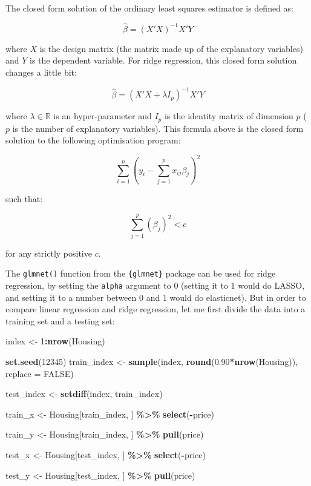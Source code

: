 \documentclass[
]{article}
\newenvironment{Shaded}{\begin{snugshade}}{\end{snugshade}}
\newcommand{\DataTypeTok}[1]{\textcolor[rgb]{0.13,0.29,0.53}{#1}}
\newcommand{\DecValTok}[1]{\textcolor[rgb]{0.00,0.00,0.81}{#1}}
\newcommand{\FloatTok}[1]{\textcolor[rgb]{0.00,0.00,0.81}{#1}}
\newcommand{\KeywordTok}[1]{\textcolor[rgb]{0.13,0.29,0.53}{\textbf{#1}}}
\newcommand{\NormalTok}[1]{#1}
\newcommand{\OperatorTok}[1]{\textcolor[rgb]{0.81,0.36,0.00}{\textbf{#1}}}
\newcommand{\OtherTok}[1]{\textcolor[rgb]{0.56,0.35,0.01}{#1}}
\newcommand{\StringTok}[1]{\textcolor[rgb]{0.31,0.60,0.02}{#1}}
\begin{document}
The closed form solution of the ordinary least squares estimator is defined as:

\[
\widehat{\beta} = (X'X)^{-1}X'Y
\]

where \(X\) is the design matrix (the matrix made up of the explanatory variables) and \(Y\) is the
dependent variable. For ridge regression, this closed form solution changes a little bit:

\[
\widehat{\beta} = (X'X + \lambda I_p)^{-1}X'Y
\]

where \(\lambda \in \mathbb{R}\) is an hyper-parameter and \(I_p\) is the identity matrix of dimension \(p\)
(\(p\) is the number of explanatory variables).
This formula above is the closed form solution to the following optimisation program:

\[
\sum_{i=1}^n \left(y_i - \sum_{j=1}^px_{ij}\beta_j\right)^2 
\]

such that:

\[
\sum_{j=1}^p(\beta_j)^2 < c
\]

for any strictly positive \(c\).

The \texttt{glmnet()} function from the \texttt{\{glmnet\}} package can be used for ridge regression, by setting
the \texttt{alpha} argument to 0 (setting it to 1 would do LASSO, and setting it to a number between
0 and 1 would do elasticnet). But in order to compare linear regression and ridge regression,
let me first divide the data into a training set and a testing set:

\begin{Shaded}
\begin{Highlighting}[]
\NormalTok{index \textless{}{-}}\StringTok{ }\DecValTok{1}\OperatorTok{:}\KeywordTok{nrow}\NormalTok{(Housing)}

\KeywordTok{set.seed}\NormalTok{(}\DecValTok{12345}\NormalTok{)}
\NormalTok{train\_index \textless{}{-}}\StringTok{ }\KeywordTok{sample}\NormalTok{(index, }\KeywordTok{round}\NormalTok{(}\FloatTok{0.90}\OperatorTok{*}\KeywordTok{nrow}\NormalTok{(Housing)), }\DataTypeTok{replace =} \OtherTok{FALSE}\NormalTok{)}

\NormalTok{test\_index \textless{}{-}}\StringTok{ }\KeywordTok{setdiff}\NormalTok{(index, train\_index)}

\NormalTok{train\_x \textless{}{-}}\StringTok{ }\NormalTok{Housing[train\_index, ] }\OperatorTok{\%\textgreater{}\%}\StringTok{ }
\StringTok{    }\KeywordTok{select}\NormalTok{(}\OperatorTok{{-}}\NormalTok{price)}

\NormalTok{train\_y \textless{}{-}}\StringTok{ }\NormalTok{Housing[train\_index, ] }\OperatorTok{\%\textgreater{}\%}\StringTok{ }
\StringTok{    }\KeywordTok{pull}\NormalTok{(price)}

\NormalTok{test\_x \textless{}{-}}\StringTok{ }\NormalTok{Housing[test\_index, ] }\OperatorTok{\%\textgreater{}\%}\StringTok{ }
\StringTok{    }\KeywordTok{select}\NormalTok{(}\OperatorTok{{-}}\NormalTok{price)}

\NormalTok{test\_y \textless{}{-}}\StringTok{ }\NormalTok{Housing[test\_index, ] }\OperatorTok{\%\textgreater{}\%}\StringTok{ }
\StringTok{    }\KeywordTok{pull}\NormalTok{(price)}
\end{Highlighting}
\end{Shaded}
\end{document}
